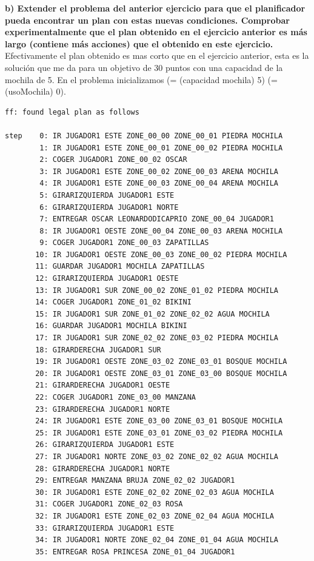 \documentclass[12pt]{article}
\begin{document}
\textbf{b) Extender el problema del anterior ejercicio para que el planificador pueda
encontrar un plan con estas nuevas condiciones. Comprobar
experimentalmente que el plan obtenido en el ejercicio anterior es más largo
(contiene más acciones) que el obtenido en este ejercicio.}\\

Efectivamente el plan obtenido es mas corto que en el ejercicio anterior, esta es la solución que me da para un objetivo de 30 puntos con una capacidad de la mochila de 5. En el problema inicializamos (= (capacidad mochila) 5)
      (= (usoMochila) 0).

\begin{verbatim}
ff: found legal plan as follows

step    0: IR JUGADOR1 ESTE ZONE_00_00 ZONE_00_01 PIEDRA MOCHILA
        1: IR JUGADOR1 ESTE ZONE_00_01 ZONE_00_02 PIEDRA MOCHILA
        2: COGER JUGADOR1 ZONE_00_02 OSCAR
        3: IR JUGADOR1 ESTE ZONE_00_02 ZONE_00_03 ARENA MOCHILA
        4: IR JUGADOR1 ESTE ZONE_00_03 ZONE_00_04 ARENA MOCHILA
        5: GIRARIZQUIERDA JUGADOR1 ESTE
        6: GIRARIZQUIERDA JUGADOR1 NORTE
        7: ENTREGAR OSCAR LEONARDODICAPRIO ZONE_00_04 JUGADOR1
        8: IR JUGADOR1 OESTE ZONE_00_04 ZONE_00_03 ARENA MOCHILA
        9: COGER JUGADOR1 ZONE_00_03 ZAPATILLAS
       10: IR JUGADOR1 OESTE ZONE_00_03 ZONE_00_02 PIEDRA MOCHILA
       11: GUARDAR JUGADOR1 MOCHILA ZAPATILLAS
       12: GIRARIZQUIERDA JUGADOR1 OESTE
       13: IR JUGADOR1 SUR ZONE_00_02 ZONE_01_02 PIEDRA MOCHILA
       14: COGER JUGADOR1 ZONE_01_02 BIKINI
       15: IR JUGADOR1 SUR ZONE_01_02 ZONE_02_02 AGUA MOCHILA
       16: GUARDAR JUGADOR1 MOCHILA BIKINI
       17: IR JUGADOR1 SUR ZONE_02_02 ZONE_03_02 PIEDRA MOCHILA
       18: GIRARDERECHA JUGADOR1 SUR
       19: IR JUGADOR1 OESTE ZONE_03_02 ZONE_03_01 BOSQUE MOCHILA
       20: IR JUGADOR1 OESTE ZONE_03_01 ZONE_03_00 BOSQUE MOCHILA
       21: GIRARDERECHA JUGADOR1 OESTE
       22: COGER JUGADOR1 ZONE_03_00 MANZANA
       23: GIRARDERECHA JUGADOR1 NORTE
       24: IR JUGADOR1 ESTE ZONE_03_00 ZONE_03_01 BOSQUE MOCHILA
       25: IR JUGADOR1 ESTE ZONE_03_01 ZONE_03_02 PIEDRA MOCHILA
       26: GIRARIZQUIERDA JUGADOR1 ESTE
       27: IR JUGADOR1 NORTE ZONE_03_02 ZONE_02_02 AGUA MOCHILA
       28: GIRARDERECHA JUGADOR1 NORTE
       29: ENTREGAR MANZANA BRUJA ZONE_02_02 JUGADOR1
       30: IR JUGADOR1 ESTE ZONE_02_02 ZONE_02_03 AGUA MOCHILA
       31: COGER JUGADOR1 ZONE_02_03 ROSA
       32: IR JUGADOR1 ESTE ZONE_02_03 ZONE_02_04 AGUA MOCHILA
       33: GIRARIZQUIERDA JUGADOR1 ESTE
       34: IR JUGADOR1 NORTE ZONE_02_04 ZONE_01_04 AGUA MOCHILA
       35: ENTREGAR ROSA PRINCESA ZONE_01_04 JUGADOR1

\end{verbatim}
\end{document}
